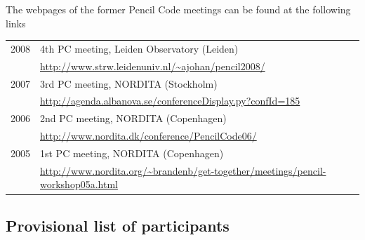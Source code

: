 \documentclass{article}
\begin{document}
The webpages of the former {\sc Pencil Code} meetings can be found at the 
following links

\begin{tabular}{ll}
2008& 4th PC meeting, Leiden Observatory (Leiden) \\
    &\url{http://www.strw.leidenuniv.nl/~ajohan/pencil2008/} \\
2007& 3rd PC meeting, NORDITA (Stockholm)\\
    &\url{http://agenda.albanova.se/conferenceDisplay.py?confId=185}\\

2006& 2nd PC meeting, NORDITA (Copenhagen)\\
    &\url{http://www.nordita.dk/conference/PencilCode06/}\\

2005& 1st PC meeting, NORDITA (Copenhagen)\\
    & \url{http://www.nordita.org/~brandenb/get-together/meetings/pencil-workshop05a.html}
\end{tabular}

\subsection*{Provisional list of participants}
\end{document}
